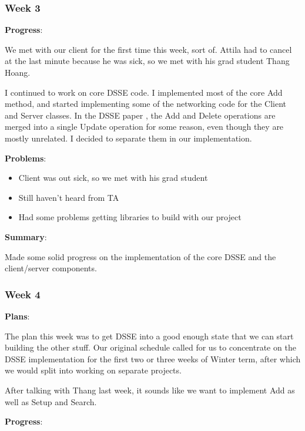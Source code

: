 \subsubsection{Week 3}

\noindent \textbf{Progress}:

We met with our client for the first time this week, sort of. Attila had to cancel at the last minute because he was sick, so we met with his grad student Thang Hoang.

I continued to work on core DSSE code. I implemented most of the core Add method, and started implementing some of the networking code for the Client and Server classes. In the DSSE paper \cite{cash14}, the Add and Delete operations are merged into a single Update operation for some reason, even though they are mostly unrelated. I decided to separate them in our implementation.


\noindent \textbf{Problems}:
\begin{itemize}
  \item Client was out sick, so we met with his grad student
  \item Still haven't heard from TA
  \item Had some problems getting libraries to build with our project
\end{itemize}

\noindent \textbf{Summary}:

Made some solid progress on the implementation of the core DSSE and the client/server components.

\subsubsection{Week 4} 

\noindent \textbf{Plans}:

The plan this week was to get DSSE into a good enough state that we can start building the other stuff. Our original schedule called for us to concentrate on the DSSE implementation for the first two or three weeks of Winter term, after which we would split into working on separate projects.

After talking with Thang last week, it sounds like we want to implement Add as well as Setup and Search.

\noindent \textbf{Progress}: 

